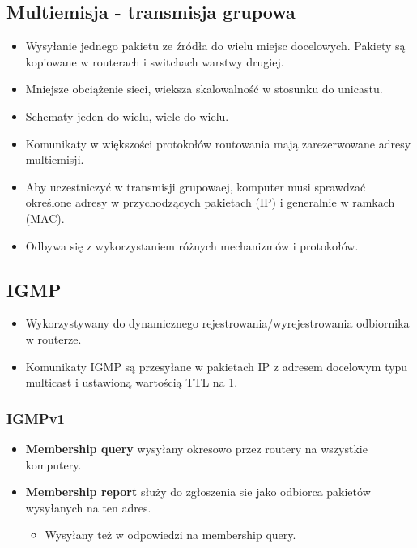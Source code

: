 \documentclass[../sk-egzamin.tex]{subfiles}
\begin{document}

\subsection*{Multiemisja - transmisja grupowa}

\begin{itemize}
    \item Wysyłanie jednego pakietu ze źródła do wielu miejsc docelowych.
    Pakiety są kopiowane w routerach i switchach warstwy drugiej.

    \item Mniejsze obciążenie sieci, wieksza skalowalność w stosunku do
    unicastu.

    \item Schematy jeden-do-wielu, wiele-do-wielu.

    \item Komunikaty w większości protokołów routowania mają zarezerwowane
    adresy multiemisji.

    \item Aby uczestniczyć w transmisji grupowaej, komputer musi sprawdzać
    określone adresy w przychodzących pakietach (IP) i generalnie w
    ramkach (MAC).

    \item Odbywa się z wykorzystaniem różnych mechanizmów i protokołów.
\end{itemize}

\subsection*{IGMP}
\begin{itemize}
    \item Wykorzystywany do dynamicznego rejestrowania/wyrejestrowania
    odbiornika w routerze.

    \item Komunikaty IGMP są przesyłane w pakietach IP z adresem docelowym
    typu multicast i ustawioną wartością TTL na 1.
\end{itemize}

\subsubsection*{IGMPv1}
\begin{itemize}
    \item \textbf{Membership query} wysyłany okresowo  przez routery na wszystkie komputery.
    \item \textbf{Membership report} służy do zgłoszenia sie jako odbiorca
    pakietów wysyłanych na ten adres.
    \begin{itemize}
        \item Wysyłany też w odpowiedzi na membership query.
    \end{itemize}
\end{itemize}
\end{document}
